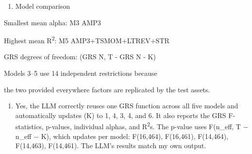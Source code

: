 \documentclass[11pt,letterpaper]{article}
\providecommand{\tightlist}{\setlength{\itemsep}{0pt}\setlength{\parskip}{0pt}}
\begin{document}
\FloatBarrier

\begin{enumerate}
\def\labelenumi{\arabic{enumi}.}
\setcounter{enumi}{3}
\tightlist
\item
  Model comparison
\end{enumerate}

Smallest mean \textbar alpha\textbar: M3 AMP3

Highest mean R\textsuperscript{2}: M5 AMP3+TSMOM+LTREV+STR

GRS degrees of freedom: (GRS N, T - GRS N - K)

Models 3--5 use 14 independent restrictions because

the two provided everywhere factors are replicated by the test assets.


\begin{enumerate}
\def\labelenumi{(\roman{enumi})}
\setcounter{enumi}{2}
\tightlist
\item
  Yes, the LLM correctly reuses one GRS function across all five models and automatically updates (K) to 1, 4, 3, 4, and 6. It also reports the GRS F-statistics, p-values, individual alphas, and R\textsuperscript{2}s. The p-value uses F(n\_eff, T \ensuremath{-} n\_eff \ensuremath{-} K), which updates per model: F(16,464), F(16,461), F(14,464), F(14,463), F(14,461). The LLM's results match my own output.
\end{enumerate}
\end{document}
